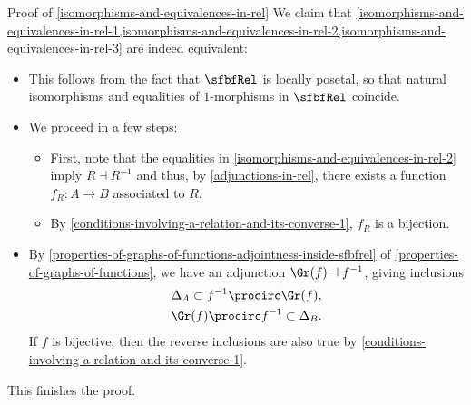 \begin{Proof}{Proof of \cref{isomorphisms-and-equivalences-in-rel}}%
    We claim that \cref{isomorphisms-and-equivalences-in-rel-1,isomorphisms-and-equivalences-in-rel-2,isomorphisms-and-equivalences-in-rel-3} are indeed equivalent:
    \begin{itemize}
        \item{}This follows from the fact that $\sfbfRel$ is locally posetal, so that natural isomorphisms and equalities of $1$-morphisms in $\sfbfRel$ coincide.
        \item{}We proceed in a few steps:
            \begin{itemize}
                \item First, note that the equalities in \cref{isomorphisms-and-equivalences-in-rel-2} imply $R\dashv R^{-1}$ and thus, by \cref{adjunctions-in-rel}, there exists a function $f_{R}\colon A\to B$ associated to $R$.
                \item By \cref{conditions-involving-a-relation-and-its-converse-1}, $f_{R}$ is a bijection.
            \end{itemize}
        \item{}By \cref{properties-of-graphs-of-functions-adjointness-inside-sfbfrel} of \cref{properties-of-graphs-of-functions}, we have an adjunction $\Gr(f)\dashv f^{-1}$, giving inclusions
            \begin{gather*}
                \Delta_{A}            \subset f^{-1}\procirc\Gr(f),\\
                \Gr(f)\procirc f^{-1} \subset \Delta_{B}.
            \end{gather*}
            If $f$ is bijective, then the reverse inclusions are also true by \cref{conditions-involving-a-relation-and-its-converse-1}.
    \end{itemize}
    This finishes the proof.
\end{Proof}
